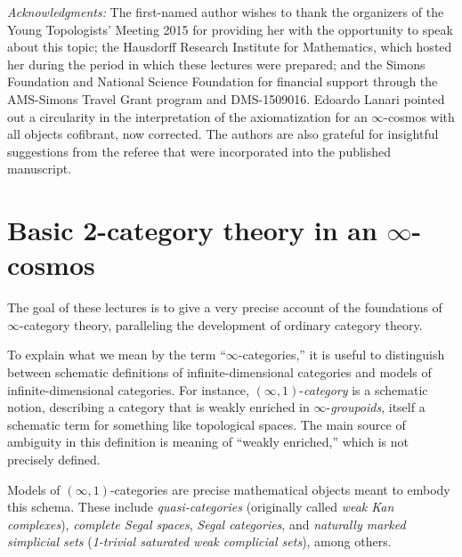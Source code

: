 \documentclass[12pt,reqno]{amsart}
\theoremstyle{plain}
\theoremstyle{definition}
\theoremstyle{remark}
\numberwithin{equation}{subsection}
\begin{document}
\maketitle
\newpage
\tableofcontents

\noindent
{\textit{Acknowledgments:} The first-named author wishes to thank the organizers of the Young Topologists' Meeting 2015 for providing her with the opportunity to speak about this topic; the Hausdorff Research Institute for Mathematics, which hosted her during the period in which these lectures were prepared; and the Simons Foundation and National Science Foundation for financial support through the AMS-Simons Travel Grant program and DMS-1509016. Edoardo Lanari pointed out a circularity in the interpretation of the axiomatization for an $\infty$-cosmos with all objects cofibrant, now corrected. The authors are also grateful for insightful suggestions from the referee that were incorporated into the published manuscript.}

\newpage

\pagestyle{plain}

\renewcommand\thesection{Lecture~\arabic{section}}
\section{Basic 2-category theory in an \texorpdfstring{$\infty$}{infinity}-cosmos}\label{sec:2-cat}
\renewcommand\thesection{\arabic{section}}

The goal of these lectures is to give a very precise account of the foundations of $\infty$-category theory, paralleling the development of ordinary category theory.

To explain what we  mean by the term ``$\infty$-categories,'' it is useful to distinguish between schematic definitions of infinite-dimensional categories and models of infinite-dimensional categories. For instance, $(\infty,1)$-\emph{category} is a schematic notion, describing a category that is weakly enriched in $\infty$-\emph{groupoids}, itself a schematic term for something like topological spaces. The main source of ambiguity in this definition is meaning of ``weakly enriched,'' which is not precisely defined.

Models of $(\infty,1)$-categories are precise mathematical objects meant to embody this schema. These include \emph{quasi-categories} (originally called \emph{weak Kan complexes}), \emph{complete Segal spaces}, \emph{Segal categories}, and \emph{naturally marked simplicial sets} (\emph{1-trivial saturated weak complicial sets}), among others.
\end{document}

